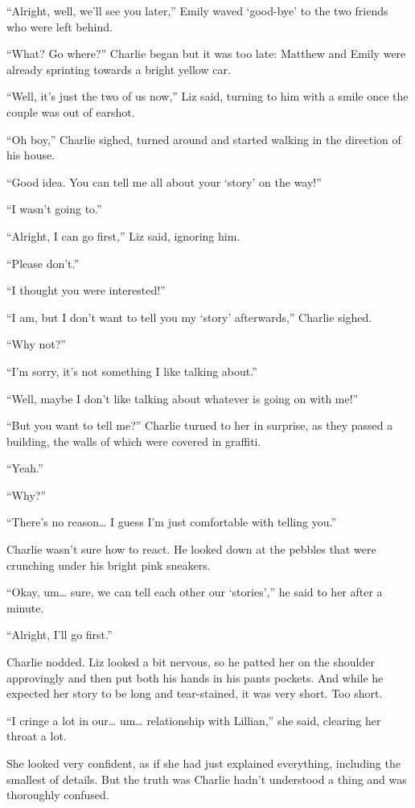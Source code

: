 “Alright, well, we'll see you later,” Emily waved ‘good-bye' to the two friends who were left behind.

“What? Go where?” Charlie began but it was too late: Matthew and Emily were already sprinting towards a bright yellow car.

“Well, it's just the two of us now,” Liz said, turning to him with a smile once the couple was out of earshot.

“Oh boy,” Charlie sighed, turned around and started walking in the direction of his house.

“Good idea. You can tell me all about your ‘story' on the way!”

“I wasn't going to.”

“Alright, I can go first,” Liz said, ignoring him.

“Please don't.”

“I thought you were interested!”

“I am, but I don't want to tell you my ‘story' afterwards,” Charlie sighed.

“Why not?”

“I'm sorry, it's not something I like talking about.”

“Well, maybe I don't like talking about whatever is going on with me!”

“But you want to tell me?” Charlie turned to her in surprise, as they passed a building, the walls of which were covered in graffiti.

“Yeah.”

“Why?”

“There's no reason… I guess I'm just comfortable with telling you.”

Charlie wasn't sure how to react. He looked down at the pebbles that were crunching under his bright pink sneakers.

“Okay, um… sure, we can tell each other our ‘stories',” he said to her after a minute.

“Alright, I'll go first.”

 Charlie nodded. Liz looked a bit nervous, so he patted her on the shoulder approvingly and then put both his hands in his pants pockets. And while he expected her story to be long and tear-stained, it was very short. Too short.

“I cringe a lot in our… um… relationship with Lillian,” she said, clearing her throat a lot.

She looked very confident, as if she had just explained everything, including the smallest of details. But the truth was Charlie hadn't understood a thing and was thoroughly confused.

